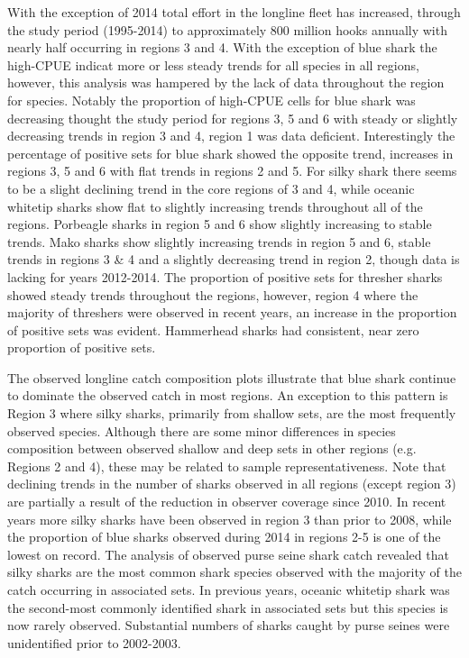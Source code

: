 \documentclass[12pt]{SCreport}
\begin{document}
With the exception of 2014 total effort in the longline fleet has increased, through the study period (1995-2014) to approximately 800 million hooks annually with nearly half occurring in regions 3 and 4. With the exception of blue shark the high-CPUE indicat more or less steady trends for all species in all regions, however, this analysis was hampered by the lack of data throughout the region for species. Notably the proportion of high-CPUE cells for blue shark was decreasing thought the study period for regions 3, 5 and 6 with steady or slightly decreasing trends in region 3 and 4, region 1 was data deficient. Interestingly the percentage of positive sets for blue shark showed the opposite trend, increases in regions 3, 5 and 6 with flat trends in regions 2 and 5. For silky shark there seems to be a slight declining trend in the core regions of 3 and 4, while oceanic whitetip sharks show flat to slightly increasing trends throughout all of the regions. Porbeagle sharks in region 5 and 6 show slightly increasing to stable trends. Mako sharks show slightly increasing trends in region 5 and 6, stable trends in regions 3 \& 4 and a slightly decreasing trend in region 2, though data is lacking for years 2012-2014. The proportion of positive sets for thresher sharks showed steady trends throughout the regions, however, region 4 where the majority of threshers were observed in recent years, an increase in the proportion of positive sets was evident. Hammerhead sharks had consistent, near zero proportion of positive sets. 

The observed longline catch composition plots illustrate that blue shark continue to dominate the observed catch in most regions. An exception to this pattern is Region 3 where silky sharks, primarily from shallow sets, are the most frequently observed species. Although there are some minor differences in species composition between observed shallow and deep sets in other regions (e.g. Regions 2 and 4), these may be related to sample representativeness. Note that declining trends in the number of sharks observed in all regions (except region 3) are partially a result of the reduction in observer coverage since 2010. In recent years more silky sharks have been observed in region 3 than prior to 2008, while the proportion of blue sharks observed during 2014 in regions 2-5 is one of the lowest on record. The analysis of observed purse seine shark catch revealed that silky sharks are the most common shark species observed with the majority of the catch occurring in associated sets. In previous years, oceanic whitetip shark was the second-most commonly identified shark in associated sets but this species is now rarely observed. Substantial numbers of sharks caught by purse seines were unidentified prior to 2002-2003.
\end{document}
